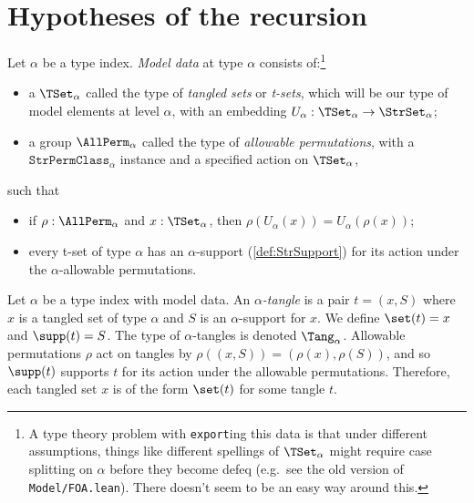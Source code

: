 \section{Hypotheses of the recursion}
\begin{definition}
  \label{def:ModelData}
  \leanok
  Let \( \alpha \) be a type index.
  \emph{Model data} at type \( \alpha \) consists of:\footnote{A type theory problem with \texttt{export}ing this data is that under different assumptions, things like different spellings of \( \TSet_\alpha \) might require case splitting on \( \alpha \) before they become defeq (e.g.\ see the old version of \texttt{Model/FOA.lean}). There doesn't seem to be an easy way around this.}
  \begin{itemize}
    \item a \( \TSet_\alpha \) called the type of \emph{tangled sets} or \emph{t-sets}, which will be our type of model elements at level \( \alpha \), with an embedding \( U_\alpha : \TSet_\alpha \to \StrSet_\alpha \);
    \item a group \( \AllPerm_\alpha \) called the type of \emph{allowable permutations}, with a \( \texttt{StrPermClass}_\alpha \) instance and a specified action on \( \TSet_\alpha \),
  \end{itemize}
  such that
  \begin{itemize}
    \item if \( \rho : \AllPerm_\alpha \) and \( x : \TSet_\alpha \), then \( \rho(U_\alpha(x)) = U_\alpha(\rho(x)) \);
    \item every t-set of type \( \alpha \) has an \( \alpha \)-support (\cref{def:StrSupport}) for its action under the \( \alpha \)-allowable permutations.
  \end{itemize}
\end{definition}
\begin{definition}[tangle]
  \label{def:Tangle}
  \leanok
  Let \( \alpha \) be a type index with model data.
  An \emph{\( \alpha \)-tangle} is a pair \( t = (x, S) \) where \( x \) is a tangled set of type \( \alpha \) and \( S \) is an \( \alpha \)-support for \( x \).
  We define \( \set(t) = x \) and \( \supp(t) = S \).
  The type of \( \alpha \)-tangles is denoted \( \Tang_\alpha \).
  Allowable permutations \( \rho \) act on tangles by \( \rho((x, S)) = (\rho(x), \rho(S)) \), and so \( \supp(t) \) supports \( t \) for its action under the allowable permutations.
  Therefore, each tangled set \( x \) is of the form \( \set(t) \) for some tangle \( t \).
\end{definition}
